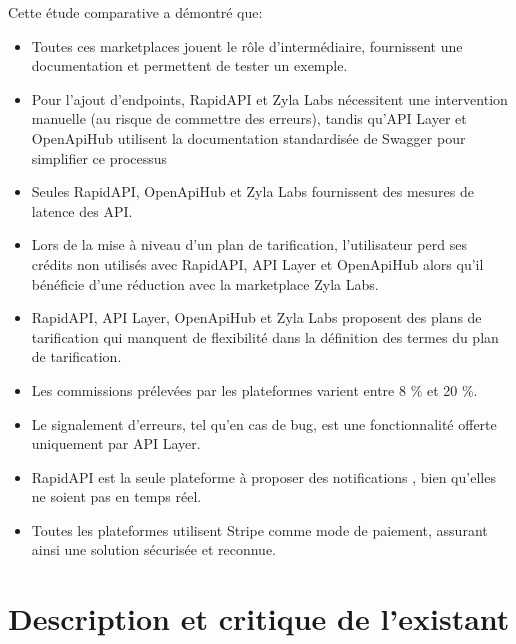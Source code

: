 Cette étude comparative a démontré que:
\begin{itemize}
    \item \begin{minipage}[t]{\linewidth}
        Toutes ces marketplaces jouent le rôle d’intermédiaire, fournissent une documentation et permettent de tester un exemple.
      \end{minipage}
      \vspace{1pt}

    \item Pour l’ajout d’endpoints, RapidAPI et Zyla Labs nécessitent une intervention manuelle (au risque de commettre des erreurs), tandis qu’API Layer et OpenApiHub utilisent la documentation standardisée de Swagger pour simplifier ce processus
    
    \item Seules RapidAPI, OpenApiHub et Zyla Labs fournissent des mesures de latence des API.
    \item Lors de la mise à niveau d’un plan de tarification, l’utilisateur perd ses crédits non utilisés avec RapidAPI, API Layer et OpenApiHub alors qu’il bénéficie d’une réduction avec la marketplace Zyla Labs.
    \item RapidAPI, API Layer, OpenApiHub et Zyla Labs proposent des plans de tarification qui manquent de flexibilité dans la définition des termes du plan de tarification. 
    \item Les commissions prélevées par les plateformes varient entre 8 \% et 20 \%.
    \item Le signalement d'erreurs, tel qu'en cas de bug, est une fonctionnalité offerte uniquement par API Layer.
    \item RapidAPI est la seule plateforme à proposer des notifications , bien qu'elles ne soient pas en temps réel.
    \item Toutes les plateformes utilisent Stripe comme mode de paiement, assurant ainsi une solution sécurisée et reconnue.
\end{itemize}
\pagebreak
\section{Description et critique de l’existant}

